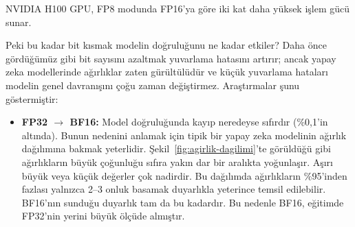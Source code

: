 NVIDIA H100 GPU, FP8 modunda FP16'ya göre iki kat daha yüksek işlem gücü sunar.

Peki bu kadar bit kısmak modelin doğruluğunu ne kadar etkiler? Daha önce gördüğümüz gibi bit sayısını azaltmak yuvarlama hatasını artırır; ancak yapay zeka modellerinde ağırlıklar zaten gürültülüdür ve küçük yuvarlama hataları modelin genel davranışını çoğu zaman değiştirmez. Araştırmalar şunu göstermiştir:

\begin{itemize}
\item \textbf{FP32 $\rightarrow$ BF16:} Model doğruluğunda kayıp neredeyse sıfırdır (\%0{,}1'in altında). Bunun nedenini anlamak için tipik bir yapay zeka modelinin ağırlık dağılımına bakmak yeterlidir. Şekil~\ref{fig:agirlik-dagilimi}'te görüldüğü gibi ağırlıkların büyük çoğunluğu sıfıra yakın dar bir aralıkta yoğunlaşır. Aşırı büyük veya küçük değerler çok nadirdir. Bu dağılımda ağırlıkların \%95'inden fazlası yalnızca 2--3 onluk basamak duyarlıkla yeterince temsil edilebilir. BF16'nın sunduğu duyarlık tam da bu kadardır. Bu nedenle BF16, eğitimde FP32'nin yerini büyük ölçüde almıştır.

\begin{figure}[htbp]
\centering
{}
\end{figure}
\end{itemize}
